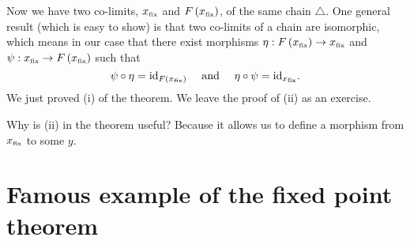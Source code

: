 \begin{enumcirc}
	Now we have two co-limits, $x_{\textrm{\tiny fix}}$ and
	$F\left( x_{\textrm{\tiny fix}} \right)$, of the same chain $\triangle$.
	One general result (which is easy to show) is that two co-limits of a chain are
	isomorphic, which means in our case that there exist morphisms $\eta:
		F\left( x_{\textrm{\tiny fix}} \right) \to x_{\textrm{\tiny fix}}$ and $\psi:
		x_{\textrm{\tiny fix}} \to F\left( x_{\textrm{\tiny fix}} \right)$ such that
	\[
		\psi \circ \eta = \textrm{id}_{F\left( x_{\textrm{\tiny fix}} \right)} \quad \textrm{ and } \quad \eta \circ \psi = \textrm{id}_{x_{\textrm{\tiny fix}}}.
	\]
	We just proved (i) of the theorem.
	We leave the proof of (ii) as an exercise.
	\item
	Why is (ii) in the theorem useful?
	Because it allows us to define a morphism from $x_{\textrm{\tiny fix}}$ to some
	$y$.
\end{enumcirc}

\section{Famous example of the fixed point theorem}

